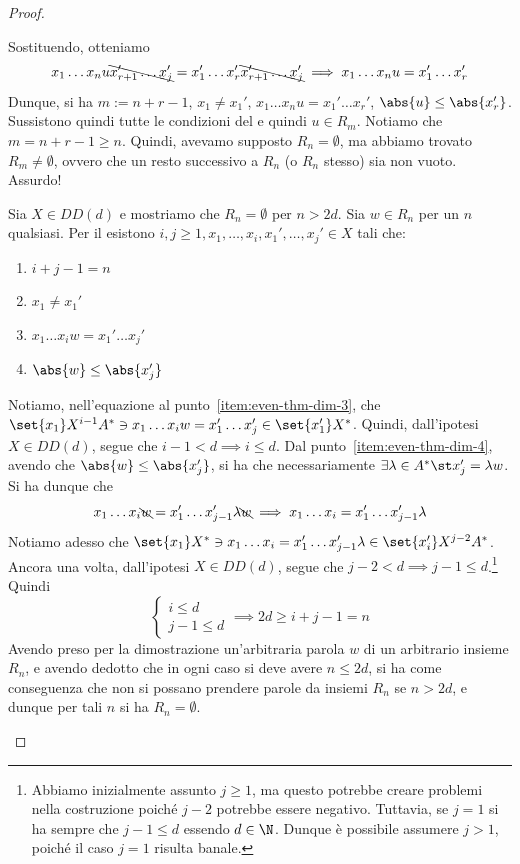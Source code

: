 \begin{proof}
\begin{description}
      Sostituendo, otteniamo
      \[x_1\ldots x_n u \bcancel{x_{r+1}'\ldots x_j'} = x_1'\ldots x_r' \bcancel{x_{r+1}'\ldots x_j'} \implies x_1\ldots x_n u = x_1'\ldots x_r'\]
      Dunque, si ha $m:=n+r-1$, $x_1\neq x_1'$, $x_1\ldots x_n u = x_1'\ldots x_r'$, $\abs{u} \leq \abs{x_r'}$.
      Sussistono quindi tutte le condizioni del  e quindi \(u \in R_{m}\). Notiamo che $m=n+r-1\geq n$.
      Quindi, avevamo supposto \(R_n = \emptyset\), ma abbiamo trovato $R_{m} \neq \emptyset$, ovvero che un resto successivo a $R_n$ (o $R_n$ stesso) sia non vuoto. Assurdo!
    \item[\q{\(\implies\)}]
      Sia \(X \in DD(d)\) e mostriamo che \(R_n = \emptyset\) per \(n > 2d\).
      Sia \(w \in R_n\) per un \(n\) qualsiasi. 
      Per il  esistono \(i,j \geq 1, x_1,\ldots,x_i, x_1',\ldots,x_j' \in X\) tali che:
      \begin{enumerate}
        \item \(i+j - 1 = n\)
        \item \(x_1 \neq x_1'\)
        \item \(x_1\ldots x_i w = x_1'\ldots x_j'\)\label{item:even-thm-dim-3}
        \item \(\abs{w} \leq \abs{x_j'}\)\label{item:even-thm-dim-4}
      \end{enumerate}
      Notiamo, nell'equazione al punto~\ref{item:even-thm-dim-3}, che $\set{x_1} X^{i-1} A^{*} \ni x_1\ldots x_i w = x_1'\ldots x_j' \in \set{x_1'} X^{*}$. Quindi, dall'ipotesi \(X \in DD(d)\), segue che \(i-1 < d\implies i\leq d\).
      Dal punto~\ref{item:even-thm-dim-4}, avendo che \(\abs{w} \leq \abs{x_j'}\), si ha che necessariamente \(\exists \lambda \in A^* \st x_j'=\lambda w\).
      Si ha dunque che 
      \[x_1\ldots x_i \bcancel{w} = x_1'\ldots x_{j-1}' \lambda \bcancel{w}\implies x_1\ldots x_i = x_1'\ldots x_{j-1}' \lambda\]
      Notiamo adesso che $\set{x_1} X^{*} \ni x_1\ldots x_i = x_1'\ldots x_{j-1}' \lambda \in \set{x_i'} X^{j-2} A^{*}$. Ancora una volta, dall'ipotesi \(X \in DD(d)\), segue che \(j-2<d\implies j-1\leq d\).\footnote{Abbiamo inizialmente assunto \(j \geq 1\), ma questo potrebbe creare problemi nella costruzione poiché \(j-2\) potrebbe essere negativo. Tuttavia, se \(j=1\) si ha sempre che \(j-1 \leq d\) essendo \(d \in \N\). Dunque è possibile assumere \(j > 1\), poiché il caso \(j = 1\) risulta banale.}
      Quindi $$\begin{cases}
        i \leq d \\
        j-1 \leq d
      \end{cases} \implies 2d \geq i+j-1 = n$$
      Avendo preso per la dimostrazione un'arbitraria parola \(w\) di un arbitrario insieme \(R_n\), e avendo dedotto che in ogni caso si deve avere \(n\leq 2d\), si ha come conseguenza che non si possano prendere parole da insiemi \(R_n\) se \(n > 2d\), e dunque per tali \(n\) si ha \(R_n = \emptyset\).
  \end{description}
\end{proof}

